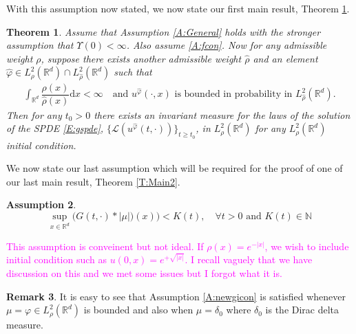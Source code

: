 \documentclass[a4paper,11pt]{article}%
\numberwithin{equation}{section}
\theoremstyle{plain}
\newtheorem{theorem}{Theorem}[section]
\theoremstyle{definition}
\newtheorem{assumptions}[theorem]{Assumption}
\newtheorem{remark}[theorem]{Remark}
\newcommand{\R}{\mathbb{R}}
\newcommand{\ud}{\ensuremath{ \mathrm{d} }}
\begin{document}
With this assumption now stated, we now state our first main result, Theorem \ref{T:Main}.

\begin{theorem}
	\label{T:Main}
	Assume that Assumption \ref{A:General} holds with the stronger assumption that $\Upsilon(0) <\infty$. Also assume \eqref{A:fcon}. Now for any admissible weight $\rho$, suppose there exists another admissible weight $\hat\rho$ and an element $\hat{\varphi} \in L^2_\rho(\R^d) \cap L^2_{\hat\rho}(\R^d)$ such that
	\begin{align*}
	\int_{\R^d}\dfrac{\rho(x)}{\hat\rho(x)}\ud x < \infty \quad \text{and $u^{\hat\varphi}(\cdot,x)$ is bounded in probability in $L^2_{\hat\rho}(\R^d)$.}
	\end{align*}
	Then for any $t_0 >0$ there exists an invariant measure for the laws of the solution of the SPDE \eqref{E:gspde}, $\{\mathscr L (u^{\hat\varphi}(t,\cdot))\}_{t \ge t_0}$,  in $L^2_\rho(\R^d)$ for any $L^2_{\rho}(\R^d)$ initial condition.
\end{theorem}

We now state our last assumption which will be required for the proof of one of our last main result, Theorem \eqref{T:Main2}.

\begin{assumptions} $\;$
	\begin{equation}
	\sup_{x\in \R^d}	\big(G(t,\cdot)*|\mu|)(x) \big) < K(t), \quad \forall t>0 \text{ and } K(t)\in \mathbb N \label{A:newgicon}
	\end{equation}
\end{assumptions}

\textcolor{magenta}{This assumption is conveinent but not ideal. If $\rho(x)=e^{-|x|}$, we wish to include initial
condition such as  $u(0,x)=e^{+\sqrt{|x|}}$. I recall vaguely that we have discussion on this and we
met some issues but I forgot what it is.}

\begin{remark}
	It is easy to see that Assumption \eqref{A:newgicon} is satisfied whenever $\mu=\varphi \in L^2_\rho(\R^d)$ is bounded and also when $\mu = \delta_0$ where $\delta_0$ is the Dirac delta measure.
\end{remark}
\end{document}
